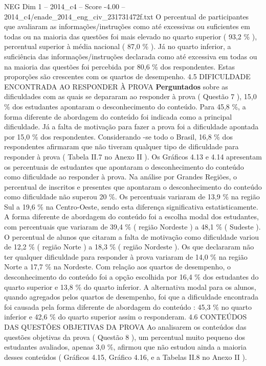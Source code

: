 \begin{textsample}{NEG Dim 1 – 2014\_c4 – Score -4.00 – 2014\_c4/enade\_2014\_eng\_civ\_231731472f.txt}
O percentual de participantes que avaliaram as informações/instruções como até excessivas ou suficientes em todas ou na maioria das questões foi mais elevado no quarto superior ( 93,2 \% ), percentual superior à média nacional ( 87,0 \% ).
Já no quarto inferior, a suficiência das informações/instruções declarada como até excessiva em todas ou na maioria das questões foi percebida por 80,6 \% dos respondentes.
Estas proporções são crescentes com os quartos de desempenho. 4.5 DIFICULDADE ENCONTRADA AO RESPONDER À PROVA \textbf{Perguntados} sobre as dificuldades com as quais se depararam ao responder à prova ( Questão 7 ), 15,0 \% dos estudantes apontaram o desconhecimento do conteúdo.
Para 45,8 \%, a forma diferente de abordagem do conteúdo foi indicada como a principal dificuldade.
Já a falta de motivação para fazer a prova foi a dificuldade apontada por 15,0 \% dos respondentes.
Considerando -se todo o Brasil, 16,8 \% dos respondentes afirmaram que não tiveram qualquer tipo de dificuldade para responder à prova ( Tabela II.7 no Anexo II ).
Os Gráficos 4.13 e 4.14 apresentam os percentuais de estudantes que apontaram o desconhecimento do conteúdo como dificuldade ao responder à prova.
Na análise por Grandes Regiões, o percentual de inscritos e presentes que apontaram o desconhecimento do conteúdo como dificuldade não superou 20 \%.
Os percentuais variaram de 13,9 \% na região Sul a 19,6 \% na Centro-Oeste, sendo esta diferença significativa estatisticamente.
A forma diferente de abordagem do conteúdo foi a escolha modal dos estudantes, com percentuais que variaram de 39,4 \% ( região Nordeste ) a 48,1 \% ( Sudeste ).
O percentual de alunos que citaram a falta de motivação como dificuldade variou de 12,2 \% ( região Norte ) a 18,3 \% ( região Nordeste ).
Os que declararam não ter qualquer dificuldade para responder à prova variaram de 14,0 \% na região Norte a 17,7 \% na Nordeste.
Com relação aos quartos de desempenho, o desconhecimento do conteúdo foi a opção escolhida por 16,4 \% dos estudantes do quarto superior e 13,8 \% do quarto inferior.
A alternativa modal para os alunos, quando agregados pelos quartos de desempenho, foi que a dificuldade encontrada foi causada pela forma diferente de abordagem do conteúdo : 45,3 \% no quarto inferior e 42,6 \% do quarto superior assim o responderam. 4.6 CONTEÚDOS DAS QUESTÕES OBJETIVAS DA PROVA Ao analisarem os conteúdos das questões objetivas da prova ( Questão 8 ), um percentual muito pequeno dos estudantes avaliados, apenas 3,0 \%, afirmou que não estudou ainda a maioria desses conteúdos ( Gráficos 4.15, Gráfico 4.16, e a Tabelas II.8 no Anexo II ).

\end{textsample}
